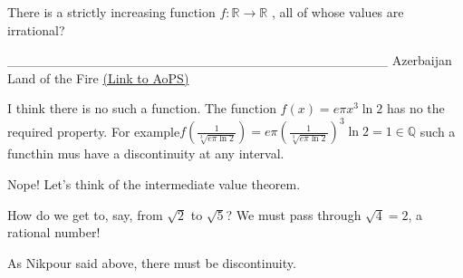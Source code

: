 \begin{problem}
	There is a strictly increasing function $f: \mathbb{R}\to\mathbb{R}$ , all of whose values are irrational?


________________________________________
Azerbaijan Land of the Fire 
	\flushright \href{https://artofproblemsolving.com/community/c6h537521}{(Link to AoPS)}
\end{problem}



\begin{solution}
	I think there is no such a function. The function   $f(x)=e\pi {{x}^{3}}\ln 2$ has no the required property. For example$f(\frac{1}{\sqrt[3]{e\pi \ln 2}})=e\pi {{(\frac{1}{\sqrt[3]{e\pi \ln 2}})}^{3}}\ln 2=1\in \mathbb{Q}$
such a functhin mus have a discontinuity at any interval.
\end{solution}



\begin{solution}
	Nope! Let's think of the intermediate value theorem.

How do we get to, say, from $\sqrt{2}$ to $\sqrt{5}$? We must pass through $\sqrt{4}=2$, a rational number!

As Nikpour said above, there must be discontinuity.
\end{solution}



